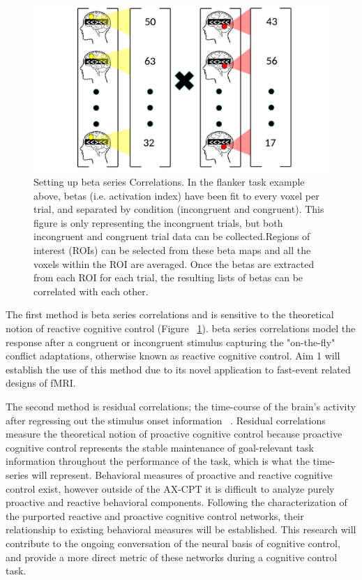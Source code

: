 \documentclass[phd,appendix,figures]{uithesis}
\begin{document}
\begin{itemize}
\begin{figure}[H]%
    \centering
    \includegraphics[scale=0.25]{betaseries_correlation_illustration}
    \caption{Setting up beta series Correlations. In the flanker task example above, betas (i.e. activation index) have been fit to every voxel per trial, and separated by condition (incongruent and congruent). This figure is only representing the incongruent trials, but both incongruent and congruent trial data can be collected.Regions of interest (ROIs) can be selected from these beta maps and all the voxels within the ROI are averaged. Once the betas are extracted from each ROI for each trial, the resulting lists of betas can be correlated with each other.}%
    \label{fig:betaseries_correlation_illustration}%
\end{figure}

The first method is beta series correlations and is sensitive to the theoretical notion of reactive cognitive control (Figure ~\ref{fig:betaseries_correlation_illustration}). 
beta series correlations model the response after a congruent or incongruent stimulus capturing the "on-the-fly" conflict adaptations, otherwise known as reactive cognitive control.
Aim 1 will establish the use of this method due to its novel application to fast-event related designs of fMRI.

The second method is residual correlations; the time-course of the brain's activity after regressing out the stimulus onset information ~\citep{Fair2007,Cole2014,Bolt2017}. 
Residual correlations measure the theoretical notion of proactive cognitive control because proactive cognitive control represents the stable maintenance of goal-relevant task information throughout the performance of the task, which is what the time-series will represent.
Behavioral measures of proactive and reactive cognitive control exist, however outside of the AX-CPT it is difficult to analyze purely proactive and reactive behavioral components. 
Following the characterization of the purported reactive and proactive cognitive control networks, their relationship to existing behavioral measures will be established.
This research will contribute to the ongoing conversation of the neural basis of cognitive control, and provide a more direct metric of these networks during a  cognitive control task.


\end{itemize}
\end{document}
